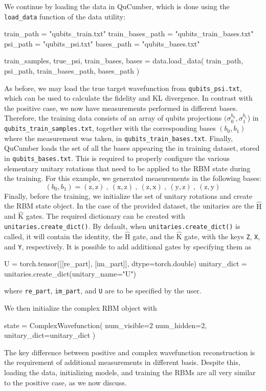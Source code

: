 \documentclass[submission, Phys, hidelnks]{SciPost}
\begin{document}
We continue by loading the data in QuCumber, which is done using the \verb|load_data| function of the data utility:
\begin{python}
train_path = "qubits_train.txt"
train_bases_path = "qubits_train_bases.txt"
psi_path = "qubits_psi.txt"
bases_path = "qubits_bases.txt"

train_samples, true_psi, train_bases, bases = data.load_data(
  train_path, psi_path, train_bases_path, bases_path
)
\end{python}
As before, we may load the true target wavefunction from \verb|qubits_psi.txt|, which can be used to calculate the fidelity and KL divergence. In contrast with the positive case, we now have measurements performed in different bases. Therefore, the training data consists of an array of qubits projections $(\sigma_0^{b_0},\sigma_1^{b_1}$) in \verb|qubits_train_samples.txt|, together with the corresponding bases $(b_0,b_1)$ where the measurement was taken, in \verb|qubits_train_bases.txt|. Finally, QuCumber loads the set of all the bases appearing the in training dataset, stored in \verb|qubits_bases.txt|. This is required to properly configure the various elementary unitary rotations that need to be applied to the RBM state during the training. For this example, we generated measurements in the following bases:
\begin{equation}
    (b_0, b_1)=(\mathrm{z},\mathrm{z})\:,\:(\mathrm{x},\mathrm{z})\:,\:(\mathrm{z},\mathrm{x})\:,\:(\mathrm{y},\mathrm{z})\:,\:(\mathrm{z},\mathrm{y})
\end{equation}
Finally, before the training, we initialize the set of unitary rotations and create the RBM state object. In the case of the provided dataset, the unitaries are the $\hat{\mathrm{H}}$ and $\hat{\mathrm{K}}$ gates. The required dictionary can be created with \verb|unitaries.create_dict()|. 
By default, when \verb|unitaries.create_dict()| is called, it will contain the identity, the $\hat{\mathrm{H}}$ gate, and the $\hat{\mathrm{K}}$ gate, with the keys \verb|Z|,  \verb|X|, and \verb|Y|, respectively. It is possible to add additional gates by specifying them as 
\begin{python}
U = torch.tensor([[re_part], [im_part]], dtype=torch.double)
unitary_dict = unitaries.create_dict(unitary_name="U")
\end{python}
where \verb|re_part|, \verb|im_part|, and \verb|U| are to be specified by the user.

We then initialize the complex RBM object with
\begin{python}
state = ComplexWavefunction(
   num_visible=2 num_hidden=2, unitary_dict=unitary_dict
)
\end{python}
The key difference between positive and complex wavefunction reconstruction is the requirement of additional measurements in different basis. Despite this, loading the data, initializing models, and training the RBMs are all very similar to the positive case, as we now discuss.
\end{document}
